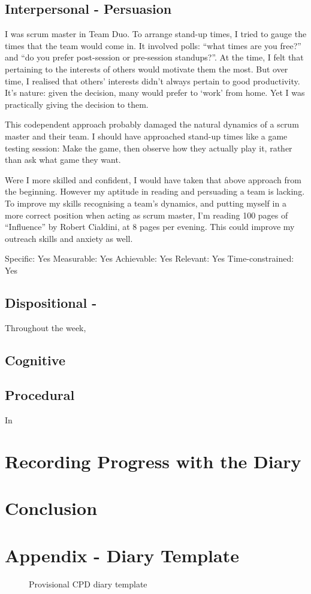 \documentclass{scrartcl}
\begin{document}
\subsection{Interpersonal - Persuasion} %
I was scrum master in Team Duo. To arrange stand-up times, I tried to gauge the times that the team would come in. It involved polls: ``what times are you free?'' and ``do you prefer post-session or pre-session standups?''. At the time, I felt that pertaining to the interests of others would motivate them the most. But over time, I realised that others' interests didn't always pertain to good productivity. It's nature: given the decision, many would prefer to `work' from home. Yet I was practically giving the decision to them.

This codependent approach probably damaged the natural dynamics of a scrum master and their team. I should have approached stand-up times like a game testing session: Make the game, then observe how they actually play it, rather than ask what game they want.

Were I more skilled and confident, I would have taken that above approach from the beginning. However my aptitude in reading and persuading a team is lacking. To improve my skills recognising a team's dynamics, and putting myself in a more correct position when acting as scrum master, I'm reading 100 pages of ``Influence'' by Robert Cialdini, at 8 pages per evening. This could improve my outreach skills and anxiety as well.

Specific: Yes
Measurable: Yes
Achievable: Yes
Relevant: Yes
Time-constrained: Yes

\subsection{Dispositional - } %
Throughout the week, 


\subsection{Cognitive} %


\subsection{Procedural} %
In 


\section{Recording Progress with the Diary} %


\section{Conclusion} %





\newpage
\section{Appendix - Diary Template}
\begin{figure}[h]
\centering
\caption{Provisional CPD diary template}
\end{figure}
\end{document}
